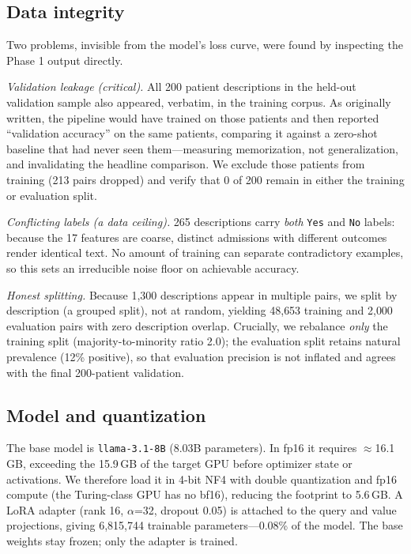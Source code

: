 \documentclass[sigconf,nonacm]{acmart}
\begin{document}
\subsection{Data integrity}
Two problems, invisible from the model's loss curve, were found by inspecting
the Phase 1 output directly.

\emph{Validation leakage (critical).} All 200 patient descriptions in the
held-out validation sample also appeared, verbatim, in the training corpus. As
originally written, the pipeline would have trained on those patients and then
reported ``validation accuracy'' on the same patients, comparing it against a
zero-shot baseline that had never seen them---measuring memorization, not
generalization, and invalidating the headline comparison. We exclude those
patients from training (213 pairs dropped) and verify that 0 of 200 remain in
either the training or evaluation split.

\emph{Conflicting labels (a data ceiling).} 265 descriptions carry \emph{both}
\texttt{Yes} and \texttt{No} labels: because the 17 features are coarse,
distinct admissions with different outcomes render identical text. No amount of
training can separate contradictory examples, so this sets an irreducible noise
floor on achievable accuracy.

\emph{Honest splitting.} Because 1{,}300 descriptions appear in multiple pairs,
we split by description (a grouped split), not at random, yielding 48{,}653
training and 2{,}000 evaluation pairs with zero description overlap. Crucially,
we rebalance \emph{only} the training split (majority-to-minority ratio 2.0);
the evaluation split retains natural prevalence (12\% positive), so that
evaluation precision is not inflated and agrees with the final 200-patient
validation.

\subsection{Model and quantization}
The base model is \texttt{llama-3.1-8B} (8.03B parameters). In fp16 it requires
$\approx$16.1\,GB, exceeding the 15.9\,GB of the target GPU before optimizer
state or activations. We therefore load it in 4-bit NF4 with double
quantization and fp16 compute (the Turing-class GPU has no bf16), reducing the
footprint to 5.6\,GB. A LoRA adapter (rank 16, $\alpha$=32, dropout 0.05) is
attached to the query and value projections, giving 6{,}815{,}744 trainable
parameters---0.08\% of the model. The base weights stay frozen; only the
adapter is trained.
\end{document}
